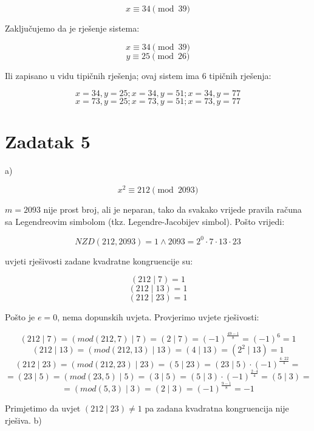 \documentclass[12pt]{article}
\begin{document}
$$x \equiv 34 \pmod{39}$$\vspace{1mm}

Zaključujemo da je rješenje sistema:

$$x \equiv 34 \pmod{39}$$
$$y \equiv 25 \pmod{26}$$\vspace{1mm}

Ili zapisano u vidu tipičnih rješenja; ovaj sistem ima 6 tipičnih rješenja:

$$x = 34, y = 25; x = 34, y = 51; x = 34, y = 77$$
$$x = 73, y = 25; x = 73, y = 51; x = 73, y = 77$$

\newpage

\section*{Zadatak 5\label{Z5} }

\hspace{6.8mm}a)

$$x^2 \equiv 212 \pmod{2093}$$\vspace{1mm}

$m = 2093$ nije prost broj, ali je neparan, tako da svakako vrijede pravila računa sa Legendreovim simbolom (tkz. Legendre-Jacobijev simbol). Pošto vrijedi:

$$NZD(212, 2093) = 1 \land 2093 = 2^0 \cdot 7 \cdot 13 \cdot 23$$ \vspace{1mm}

uvjeti rješivosti zadane kvadratne kongruencije su:

$$(212 \mid 7) = 1$$
$$(212 \mid 13) = 1$$
$$(212 \mid 23) = 1$$\vspace{1mm}

Pošto je $e = 0$, nema dopunskih uvjeta. Provjerimo uvjete rješivosti:

$$(212 \mid 7) = (mod(212, 7) \mid 7) = (2 \mid 7) = (-1)^{\frac{49-1}{8}} = (-1)^6 = 1$$
$$(212 \mid 13) = (mod(212, 13) \mid 13) = (4 \mid 13) = (2^2 \mid 13) = 1$$\vspace{1mm}
$$(212 \mid 23) = (mod(212, 23) \mid 23) = (5 \mid 23) = (23 \mid 5) \cdot (-1)^{\frac{4\cdot 22}{4}} =$$ 
$$= (23 \mid 5) = (mod(23, 5) \mid 5) = (3 \mid 5) = (5 \mid 3) \cdot (-1)^{\frac{2\cdot 4}{4}} = (5 \mid 3) =$$ 
$$= (mod(5, 3) \mid 3) = (2 \mid 3) = (-1)^{\frac{9-1}{8}} = -1$$\vspace{1mm}

Primjetimo da uvjet $(212 \mid 23) \neq 1$ pa zadana kvadratna kongruencija nije rješiva.\vspace{1mm}
\newpage
b)
\end{document}

